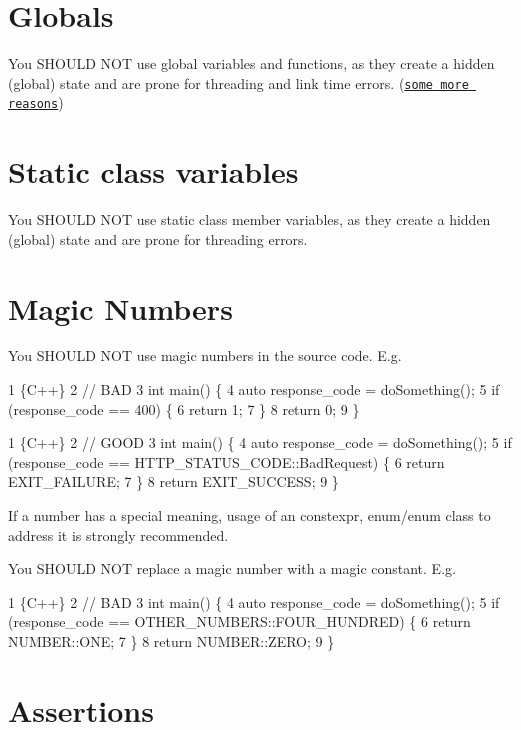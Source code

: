 \section*{Globals}

You S\+H\+O\+U\+LD N\+OT use global variables and functions, as they create a hidden (global) state and are prone for threading and link time errors. (\href{http://wiki.c2.com/?GlobalVariablesAreBad}{\tt some more reasons})

\section*{Static class variables}

You S\+H\+O\+U\+LD N\+OT use {\ttfamily static} class member variables, as they create a hidden (global) state and are prone for threading errors.

\section*{Magic Numbers}

You S\+H\+O\+U\+LD N\+OT use magic numbers in the source code. E.\+g. 
\begin{DoxyCode}
1 \{C++\}
2 // BAD
3 int main() \{
4     auto response\_code = doSomething();
5     if (response\_code == 400) \{
6         return 1;
7     \}
8     return 0;
9 \}
\end{DoxyCode}
 
\begin{DoxyCode}
1 \{C++\}
2 // GOOD
3 int main() \{
4     auto response\_code = doSomething();
5     if (response\_code == HTTP\_STATUS\_CODE::BadRequest) \{
6         return EXIT\_FAILURE;
7     \}
8     return EXIT\_SUCCESS;
9 \}
\end{DoxyCode}


If a number has a special meaning, usage of an {\ttfamily constexpr}, {\ttfamily enum}/{\ttfamily enum class} to address it is strongly recommended.

You S\+H\+O\+U\+LD N\+OT replace a magic number with a magic constant. E.\+g. 
\begin{DoxyCode}
1 \{C++\}
2 // BAD
3 int main() \{
4     auto response\_code = doSomething();
5     if (response\_code == OTHER\_NUMBERS::FOUR\_HUNDRED) \{
6         return NUMBER::ONE;
7     \}
8     return NUMBER::ZERO;
9 \}
\end{DoxyCode}
  \section*{Assertions}

